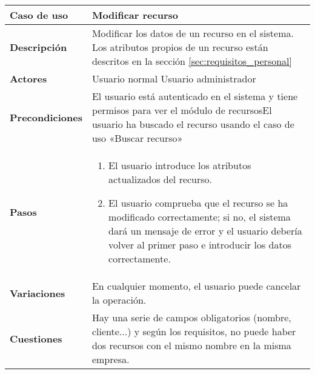 \begin{tabular}{|p{1.25in}|p{3.65in}|}\hline
\textbf{Caso de uso} & \textbf{Modificar recurso}\\\hline\hline
\textbf{Descripción} & Modificar los datos de un recurso en el sistema. Los
atributos propios de un recurso están descritos en la sección
\ref{sec:requisitos_personal}\\\hline
\textbf{Actores} & Usuario normal \newline Usuario administrador\\\hline
\textbf{Precondiciones} & El usuario está autenticado en el sistema y
tiene permisos para ver el módulo de recursos\newline El usuario ha
buscado el recurso usando el caso de uso «Buscar recurso»\\\hline
\textbf{Pasos} &
  \begin{enumerate}
   \item El usuario introduce los atributos actualizados del recurso.
   \item El usuario comprueba que el recurso se ha modificado correctamente; si
no, el sistema dará un mensaje de error y el usuario debería volver al primer
paso e introducir los datos correctamente.
  \end{enumerate}
\\\hline
\textbf{Variaciones} & En cualquier momento, el usuario puede cancelar
la operación.\\\hline
\textbf{Cuestiones} & Hay una serie de campos obligatorios (nombre,
cliente...) y según los requisitos, no puede haber dos recursos
con el mismo nombre en la misma empresa.\\\hline
\end{tabular}

